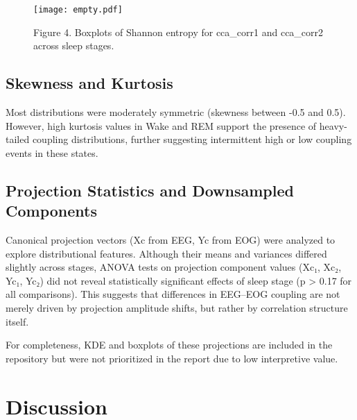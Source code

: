 \begin{figure}
\centering
\texttt{[image: empty.pdf]}
\caption{Figure 4. Boxplots of Shannon entropy for cca_corr1 and cca_corr2 across sleep stages.}
\end{figure}

\subsection{Skewness and Kurtosis}

Most distributions were moderately symmetric (skewness between -0.5 and 0.5). However, high kurtosis values in Wake and REM support the presence of heavy-tailed coupling distributions, further suggesting intermittent high or low coupling events in these states.

\subsection{Projection Statistics and Downsampled Components}
Canonical projection vectors (Xc from EEG, Yc from EOG) were analyzed to explore distributional features. Although their means and variances differed slightly across stages, ANOVA tests on projection component values (Xc₁, Xc₂, Yc₁, Yc₂) did not reveal statistically significant effects of sleep stage (p > 0.17 for all comparisons). This suggests that differences in EEG–EOG coupling are not merely driven by projection amplitude shifts, but rather by correlation structure itself.

For completeness, KDE and boxplots of these projections are included in the repository but were not prioritized in the report due to low interpretive value.

\section{Discussion}

